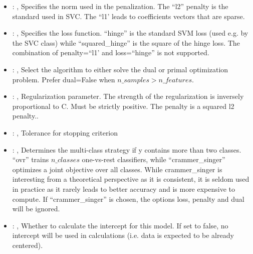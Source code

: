 \begin{itemize}
    \item {}: \xmlDesc{[l1, l2]}, 
      Specifies the norm used in the penalization. The ``l2'' penalty is the standard used in SVC.
      The ``l1' leads to coefficients vectors that are sparse.

    \item {}: , 
      Specifies the loss function. ``hinge'' is the standard SVM loss (used e.g. by the SVC class)
      while ``squared\_hinge'' is the square of the hinge loss. The combination of penalty=``l1' and
      loss=``hinge''                                                  is not supported.

    \item {}: , 
      Select the algorithm to either solve the dual or primal optimization problem.
      Prefer dual=False when $n\_samples > n\_features$.

    \item {}: , 
      Regularization parameter. The strength of the regularization is inversely
      proportional to C.                                                            Must be strictly
      positive. The penalty is a squared l2 penalty..

    \item {}: , 
      Tolerance for stopping criterion

    \item {}: , 
      Determines the multi-class strategy if y contains more than two classes. ``ovr'' trains
      $n\_classes$ one-vs-rest classifiers, while ``crammer\_singer'' optimizes a joint objective over
      all classes.                                                  While crammer\_singer is
      interesting from a theoretical perspective as it is consistent, it is seldom used
      in practice as it rarely leads to better accuracy and is more expensive to compute. If
      ``crammer\_singer''                                                  is chosen, the options
      loss, penalty and dual will be ignored.

    \item {}: , 
      Whether to calculate the intercept for this model. If set to false, no
      intercept will be used in calculations (i.e. data is expected to be already centered).


\end{itemize}

